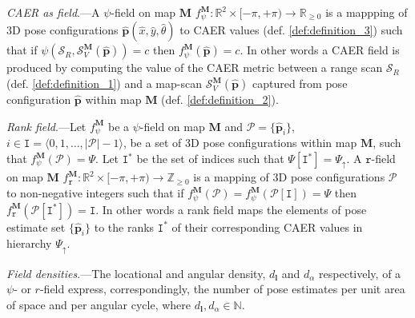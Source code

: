 \begin{definition}
  \label{def:definition_4} \textit{CAER as field}.---A $\psi$-field on map
  $\bm{M}$
  $f_{\psi}^{\bm{M}} : \mathbb{R}^2 \times [-\pi, +\pi) \rightarrow \mathbb{R}_{\geq 0}$
  is a mappping of 3D pose configurations
  $\hat{\bm{p}}(\hat{x},\hat{y},\hat{\theta})$ to CAER values (def.
  \ref{def:definition_3}) such that if
  $\psi(\mathcal{S}_R,\mathcal{S}_V^{\bm{M}}(\hat{\bm{p}})) = c$ then
  $f_{\psi}^{\bm{M}}(\hat{\bm{p}}) = c$. In other words a CAER field is
  produced by computing the value of the CAER metric between a range scan
  $\mathcal{S}_R$ (def. \ref{def:definition_1}) and a map-scan
  $\mathcal{S}_V^{\bm{M}}(\hat{\bm{p}})$ captured from pose configuration
  $\hat{\bm{p}}$ within map $\bm{M}$ (def. \ref{def:definition_2}).
\end{definition}

\begin{definition}
  \label{def:definition_5} \textit{Rank field}.---Let $f_{\psi}^{\bm{M}}$ be
  a $\psi$-field on map $\bm{M}$ and $\mathcal{P} = \{\hat{\bm{p}}_i\}$,
  $i \in \texttt{I} = \langle 0,1,\dots,|\mathcal{P}|-1 \rangle$, be a set of 3D pose
  configurations within map $\bm{M}$, such that
  $f_{\psi}^{\bm{M}}(\mathcal{P}) = \Psi$. Let $\texttt{I}^{\ast}$
  be the set of indices such that $\Psi[\texttt{I}^{\ast}] = \Psi_\uparrow$.
  A $\texttt{r}$-field on map $\bm{M}$
  $f_{\texttt{r}}^{\bm{M}} : \mathbb{R}^2 \times [-\pi, +\pi) \rightarrow \mathbb{Z}_{\geq 0}$
  is a mapping of 3D pose configurations $\mathcal{P}$ to non-negative integers
  such that if $f_{\psi}^{\bm{M}}(\mathcal{P}) = f_{\psi}^{\bm{M}}(\mathcal{P}[\texttt{I}]) = \Psi$ then
  $f_{\texttt{r}}^{\bm{M}}(\mathcal{P}[\texttt{I}^\ast]) = \texttt{I}$.
  In other words a rank field maps the elements of pose estimate set $\{\hat{\bm{p}}_i\}$
  to the ranks $\texttt{I}^\ast$ of their corresponding CAER values in
  hierarchy $\Psi_\uparrow$.
\end{definition}

\begin{definition}
  \label{def:definition_6} \textit{Field densities}.---The locational and
  angular density, $d_{\bm{l}}$ and $d_{\alpha}$ respectively, of a
  $\psi$- or $r$-field express, correspondingly, the number of pose estimates
  per unit area of space and per angular cycle, where
  $d_{\bm{l}}, d_{\alpha} \in \mathbb{N}$.
\end{definition}

